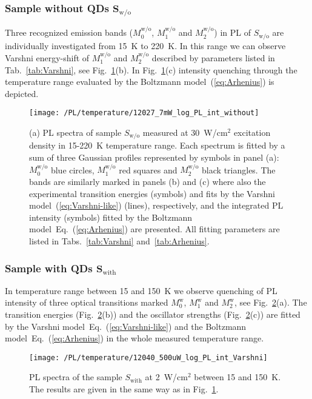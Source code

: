 \subsubsection*{Sample without QDs $\mathbf{S_\mathrm{w/o}}$}
%
Three recognized emission bands ($M_0^\mathrm{w/o}$, $M_1^\mathrm{w/o}$ and $M_2^\mathrm{w/o}$) in PL of ${S_\mathrm{w/o}}$ are individually investigated from 15~K to 220~K. In this range we can observe Varshni energy-shift of $M_1^\mathrm{w/o}$ and $M_2^\mathrm{w/o}$ described by parameters listed in Tab.~\ref{tab:Varshni}, see Fig.~\ref{fig:QD_wo_temp}(b). In Fig.~\ref{fig:QD_wo_temp}(c) intensity quenching through the temperature range evaluated by the Boltzmann model~(\ref{eq:Arhenius}) is depicted.
%
\begin{figure}
	\centering
	\texttt{[image: /PL/temperature/12027\_7mW\_log\_PL\_int\_without]}
	\caption{(a) PL spectra of sample $S_\mathrm{w/o}$ measured at 30~W/cm$^2$ excitation density in 15-220~K temperature range. Each spectrum is fitted by a sum of three Gaussian profiles represented by symbols in panel (a): $M_0^\mathrm{w/o}$ blue circles, $M_1^\mathrm{w/o}$ red squares and $M_2^\mathrm{w/o}$ black triangles. The bands are similarly marked in panels (b) and (c) where also the experimental transition energies (symbols) and fits by the Varshni model~(\ref{eq:Varshni-like}) (lines), respectively, and the integrated PL intensity (symbols) fitted by the Boltzmann model~Eq.~(\ref{eq:Arhenius}) are presented. All fitting parameters are listed in Tabs.~\ref{tab:Varshni} and~\ref{tab:Arhenius}.}
	\label{fig:QD_wo_temp}
\end{figure}


\subsubsection*{Sample with QDs $\mathbf{S_\mathrm{with}}$}
%
In temperature range between 15 and 150~K we observe quenching of PL intensity of three optical transitions marked $M_0^\mathrm{w}$, $M_1^\mathrm{w}$ and $M_2^\mathrm{w}$, see Fig.~\ref{fig:QD_w_temp}(a). The transition energies (Fig.~\ref{fig:QD_w_temp}(b)) and the oscillator strengths (Fig.~\ref{fig:QD_w_temp}(c)) are fitted by the Varshni model~Eq.~(\ref{eq:Varshni-like}) and the Boltzmann model~Eq.~(\ref{eq:Arhenius}) in the whole measured temperature range.  
%
\begin{figure}
	\centering
	\texttt{[image: /PL/temperature/12040\_500uW\_log\_PL\_int\_Varshni]}
	\caption{PL spectra of the sample ${S_\mathrm{with}}$ at 2~W/cm$^2$ between 15 and 150~K. The results are given in the same way as in Fig.~\ref{fig:QD_wo_temp}.}
	\label{fig:QD_w_temp}
\end{figure}

